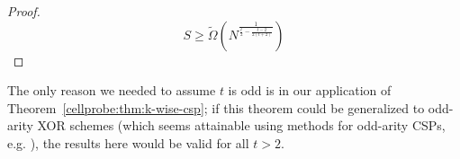 \begin{proof}
\[
S \geq \tilde{\Omega}(N^{\frac{1}{\frac{t}{2} -\frac{t- 2}{2(t+2)}}})
\]
\end{proof}

The only reason we needed to assume $t$ is odd is in our application of Theorem~\ref{cellprobe:thm:k-wise-csp}; if this theorem could be generalized to odd-arity XOR schemes (which seems attainable using methods for odd-arity CSPs, e.g. \cite{smoothed}), the results here would be valid for all $t > 2$. 

